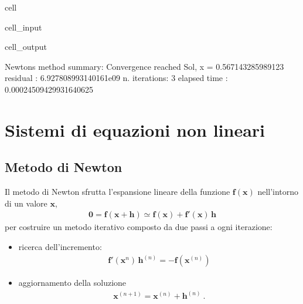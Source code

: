 \documentclass[letterpaper,10pt,italian]{jupyterBook}
\begin{document}
\begin{sphinxuseclass}{cell}
\begin{sphinxVerbatimInput}
\begin{sphinxuseclass}{cell_input}
\end{sphinxuseclass}\end{sphinxVerbatimInput}
\begin{sphinxVerbatimOutput}

\begin{sphinxuseclass}{cell_output}
\begin{sphinxVerbatim}[commandchars=\\\{\}]
Newton\PYGZsq{}s method summary: 
Convergence reached
Sol, x = \PYGZhy{}0.567143285989123
residual     : 6.927808993140161e\PYGZhy{}09
n. iterations: 3
elapsed time : 0.00024509429931640625
\end{sphinxVerbatim}

\end{sphinxuseclass}\end{sphinxVerbatimOutput}

\end{sphinxuseclass}

\section{Sistemi di equazioni non lineari}
\label{\detokenize{ch/numerics/nonlinear:sistemi-di-equazioni-non-lineari}}

\subsection{Metodo di Newton}
\label{\detokenize{ch/numerics/nonlinear:id1}}
\sphinxAtStartPar
Il metodo di Newton sfrutta l’espansione lineare della funzione \(\mathbf{f}(\mathbf{x})\) nell’intorno di un valore \(\mathbf{x}\),
\begin{equation*}
\begin{split}\mathbf{0} = \mathbf{f}(\mathbf{x} + \mathbf{h}) \simeq \mathbf{f}(\mathbf{x}) + \mathbf{f}'(\mathbf{x}) \, \mathbf{h}\end{split}
\end{equation*}
\sphinxAtStartPar
per costruire un metodo iterativo composto da due passi a ogni iterazione:
\begin{itemize}
\item {} 
\sphinxAtStartPar
ricerca dell’incremento:
\begin{equation*}
\begin{split}\mathbf{f}'(\mathbf{x}^{n}) \, \mathbf{h}^{(n)} = - \mathbf{f}(\mathbf{x}^{(n)})\end{split}
\end{equation*}
\item {} 
\sphinxAtStartPar
aggiornamento della soluzione
\begin{equation*}
\begin{split}\mathbf{x}^{(n+1)} = \mathbf{x}^{(n)} + \mathbf{h}^{(n)} \ .\end{split}
\end{equation*}
\end{itemize}
\end{document}
